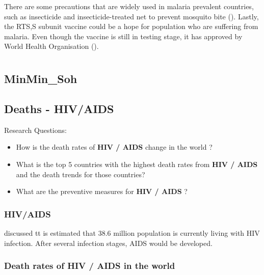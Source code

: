 \documentclass[11pt,a4paper,]{article}
\providecommand{\tightlist}{%
  \setlength{\itemsep}{0pt}\setlength{\parskip}{0pt}}
\begin{document}
There are some precautions that are widely used in malaria prevalent countries, such as insecticide and insecticide-treated net to prevent mosquito bite (\textcite{malariaintro}). Lastly, the RTS,S subunit vaccine could be a hope for population who are suffering from malaria. Even though the vaccine is still in testing stage, it has approved by World Health Organisation (\textcite{Vaccine}).

\section*{}

\hypertarget{minmin_soh}{%
\subsection{MinMin\_Soh}\label{minmin_soh}}

\hypertarget{deaths---hivaids}{%
\subsection{Deaths - HIV/AIDS}\label{deaths---hivaids}}

Research Questions:

\begin{itemize}
\tightlist
\item
  How is the death rates of \textbf{HIV / AIDS} change in the world ?
\item
  What is the top 5 countries with the highest death rates from \textbf{HIV / AIDS} and the death trends for those countries?
\item
  What are the preventive measures for \textbf{HIV / AIDS} ?
\end{itemize}

\clearpage

\hypertarget{hivaids}{%
\subsubsection{HIV/AIDS}\label{hivaids}}

\textcite{cai2009stability} discussed tt is estimated that 38.6 million population is currently living with HIV infection. After several infection stages, AIDS would be developed.

\hypertarget{death-rates-of-hiv-aids-in-the-world}{%
\subsubsection{\texorpdfstring{Death rates of \textbf{HIV / AIDS} in the world}{Death rates of HIV / AIDS in the world}}\label{death-rates-of-hiv-aids-in-the-world}}
\end{document}
